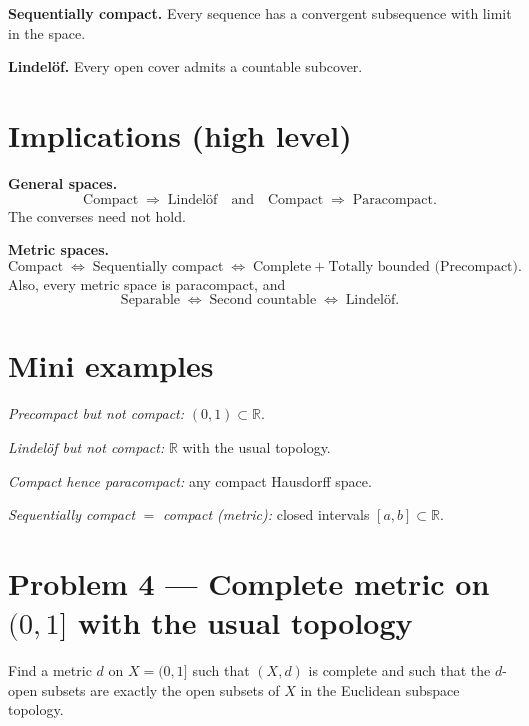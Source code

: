 \documentclass[12pt,a4paper]{article}
\theoremstyle{plain}
\theoremstyle{definition}
\theoremstyle{remark}
\theoremstyle{remark}
\begin{document}
\smallskip

\noindent\textbf{Sequentially compact.}
Every sequence has a convergent subsequence with limit in the space.

\smallskip

\noindent\textbf{Lindel\"of.}
Every open cover admits a countable subcover.

\smallskip

\section*{Implications (high level)}

\noindent\textbf{General spaces.}
\[
\text{Compact} \;\Rightarrow\; \text{Lindel\"of} \quad\text{and}\quad
\text{Compact} \;\Rightarrow\; \text{Paracompact}.
\]
The converses need not hold.

\smallskip

\noindent\textbf{Metric spaces.}
\[
\text{Compact} \;\Longleftrightarrow\; \text{Sequentially compact}
\;\Longleftrightarrow\; \text{Complete}+\text{Totally bounded (Precompact)}.
\]
Also, every metric space is paracompact, and
\[
\text{Separable} \;\Longleftrightarrow\; \text{Second countable}
\;\Longleftrightarrow\; \text{Lindel\"of}.
\]

\smallskip

\section*{Mini examples}

\noindent\emph{Precompact but not compact:} \((0,1)\subset\mathbb{R}\).

\smallskip

\noindent\emph{Lindel\"of but not compact:} \(\mathbb{R}\) with the usual topology.

\smallskip

\noindent\emph{Compact hence paracompact:} any compact Hausdorff space.

\smallskip

\noindent\emph{Sequentially compact} \(=\) \emph{compact (metric):} closed intervals \([a,b]\subset\mathbb{R}\).

\section*{Problem 4 — Complete metric on $(0,1]$ with the usual topology}

Find a metric \(d\) on \(X=(0,1]\) such that \((X,d)\) is complete and such that the \(d\)-open subsets
are exactly the open subsets of \(X\) in the Euclidean subspace topology.
\end{document}
